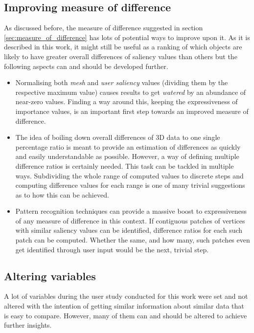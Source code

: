 	\subsection{Improving measure of difference}
	\label{sec:improve_mod}
As discussed before, the measure of difference suggested in section \ref{sec:measure_of_difference} has lots of potential ways to improve upon it. As it is described in this work, it might still be useful as a ranking of which objects are likely to have greater overall differences of saliency values than others but the following aspects can and should be developed further.

\begin{itemize}
	\item Normalising both \textit{mesh} and \textit{user saliency} values (dividing them by the respective maximum value) causes results to get \textit{watered} by an abundance of near-zero values. Finding a way around this, keeping the expressiveness of importance values, is an important first step towards an improved measure of difference.
	\item The idea of boiling down overall differences of 3D data to one single percentage ratio is meant to provide an estimation of differences as quickly and easily understandable as possible. However, a way of defining multiple difference ratios is certainly needed. This task can be tackled in multiple ways. Subdividing the whole range of computed values to discrete steps and computing difference values for each range is one of many trivial suggestions as to how this can be achieved.
	\item Pattern recognition techniques can provide a massive boost to expressiveness of any measure of difference in this context. If contiguous patches of vertices with similar saliency values can be identified, difference ratios for each such patch can be computed. Whether the same, and how many, such patches even get identified through user input would be the next, trivial step.
\end{itemize}

	\subsection{Altering variables}
	\label{sec:variables}
A lot of variables during the user study conducted for this work were set and not altered with the intention of getting similar information about similar data that is easy to compare. However, many of them can and should be altered to achieve further insights.

